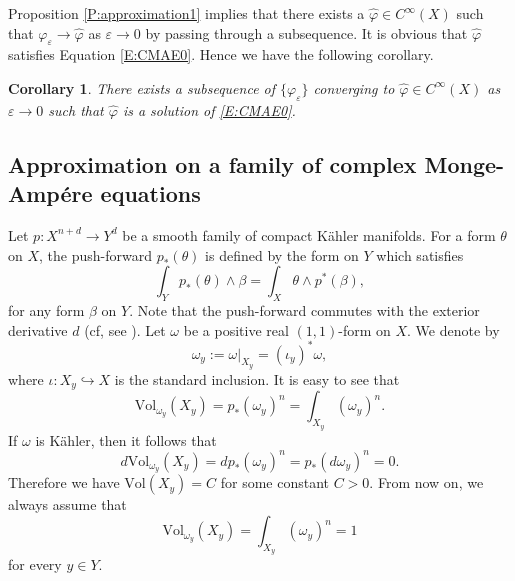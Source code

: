 \documentclass{amsart}
\newtheorem{corollary}[theorem]{Corollary}
\theoremstyle{definition}
\numberwithin{equation}{section}
\begin{document}
Proposition \ref{P:approximation1} implies that there exists a $\hat{\varphi}\in C^\infty(X)$ such that ${\varphi}_{\varepsilon}\rightarrow\hat{\varphi}$ as ${\varepsilon}\rightarrow0$ by passing through a subsequence. It is obvious that $\hat{\varphi}$ satisfies Equation \eqref{E:CMAE0}. Hence we have the following corollary.

\begin{corollary}
There exists a subsequence of $\{{\varphi}_{\varepsilon}\}$ converging to $\hat{\varphi}\in C^\infty(X)$ as ${\varepsilon}\rightarrow0$ such that $\hat{\varphi}$ is a solution of \eqref{E:CMAE0}.
\end{corollary}

\subsection{Approximation on a family of complex Monge-Amp\'ere equations}
\label{SS:AFCMAE}

Let $p:X^{n+d}\rightarrow Y^d$ be a smooth family of compact K\"ahler manifolds. For a form $\theta$ on $X$, the push-forward $p_*(\theta)$ is defined by the form on $Y$ which satisfies
\begin{equation*}
\int_Y p_*(\theta)\wedge\beta
=
\int_X \theta\wedge p^*(\beta),
\end{equation*}
for any form $\beta$ on $Y$. Note that the push-forward commutes with the exterior derivative $d$ (cf, see \cite{Berndtsson1}). Let $\omega$ be a positive real $(1,1)$-form on $X$. We denote by
\begin{equation*}
\omega_y:=\omega\vert_{X_y}=(\iota_y)^*\omega,
\end{equation*}
where $\iota:X_y\hookrightarrow X$ is the standard inclusion. It is easy to see that
\begin{equation*}
\mathrm{Vol}_{\omega_y}(X_y)
=
p_*{\left({\omega_y}\right)}^n
=
\int_{X_y}{\left({\omega_y}\right)}^n.
\end{equation*}
If $\omega$ is K\"ahler, then it follows that
\begin{equation*}
d\mathrm{Vol}_{\omega_y}(X_y)
=
dp_*{\left({\omega_y}\right)}^n
=
p_*{\left({d\omega_y}\right)}^n
=
0.
\end{equation*}
Therefore we have $\mathrm{Vol}(X_y)=C$ for some constant $C>0$. From now on, we always assume that
\begin{equation*}
\mathrm{Vol}_{\omega_y}(X_y)=\int_{X_y}{\left({\omega_y}\right)}^n=1
\end{equation*}
for every $y\in Y$.
\medskip
\end{document}
